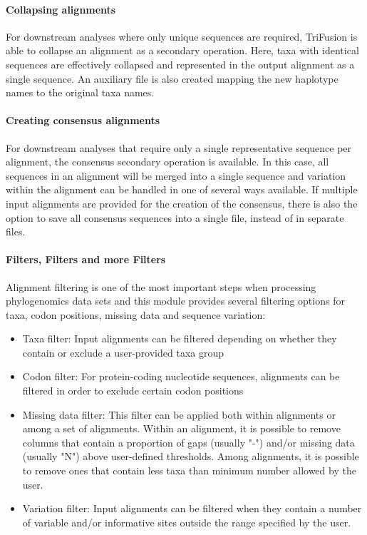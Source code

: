 \documentclass[12pt]{article}
\begin{document}

\paragraph{Collapsing alignments}

For downstream analyses where only unique sequences are required, TriFusion is able to collapse an alignment as a secondary operation. Here, taxa with identical sequences are effectively collapsed and represented in the output alignment as a single sequence. An auxiliary file is also created mapping the new haplotype names to the original taxa names.

\paragraph{Creating consensus alignments}

For downstream analyses that require only a single representative sequence per alignment, the consensus secondary operation is available. In this case, all sequences in an alignment will be merged into a single sequence and variation within the alignment can be handled in one of several ways available. If multiple input alignments are provided for the creation of the consensus, there is also the option to save all consensus sequences into a single file, instead of in separate files. 

\paragraph{Filters, Filters and more Filters}

Alignment filtering is one of the most important steps when processing phylogenomics data sets and this module provides several filtering options for taxa, codon positions, missing data and sequence variation:

\begin{itemize}
\item Taxa filter: Input alignments can be filtered depending on whether they contain or exclude a user-provided taxa group
\item Codon filter: For protein-coding nucleotide sequences, alignments can be filtered in order to exclude certain codon positions
\item Missing data filter: This filter can be applied both within alignments or among a set of alignments. Within an alignment, it is possible to remove columns that contain a proportion of gaps (usually "-") and/or missing data (usually "N") above user-defined thresholds. Among alignments, it is possible to remove ones that contain less taxa than minimum number allowed by the user.
\item Variation filter: Input alignments can be filtered when they contain a number of variable and/or informative sites outside the range specified by the user.
\end{itemize}
\end{document}

